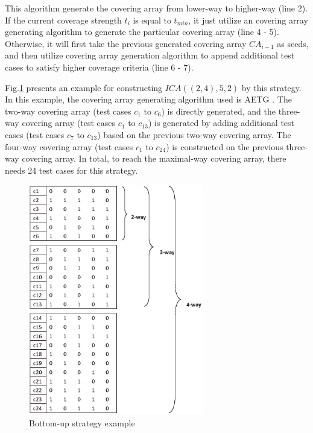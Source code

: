 \documentclass[conference]{IEEEtran}
\theoremstyle{definition}
\begin{document}
This algorithm generate the covering array from lower-way to higher-way (line 2). If the current coverage strength $t_{i}$ is equal to $t_{min}$, it just utilize an covering array generating algorithm to generate the particular covering array (line 4 - 5). Otherwise, it will first take the previous generated covering array $CA_{i - 1}$ as seeds, and then utilize covering array generation algorithm to append additional test cases to satisfy higher coverage criteria (line 6 - 7).
%

Fig.\ref{increase-example} presents an example for constructing $ICA((2,4), 5, 2)$ by this strategy. In this example, the covering array generating algorithm used is AETG \cite{cohen1997aetg}. The two-way covering array (test cases $c_{1}$ to $c_{6}$) is directly generated, and the three-way covering array (test cases $c_{1}$ to $ c_{13}$) is generated by adding additional test cases (test cases $c_{7}$ to $c_{13}$) based on the previous two-way covering array. The four-way covering array (test cases $c_{1}$ to $c_{24}$) is constructed on the previous three-way covering array. In total, to reach the maximal-way covering array, there needs 24 test cases for this strategy.
\begin{figure}
\center
 \includegraphics[width=3.0in]{increase_example.eps}
\caption{Bottom-up strategy example}
\label{increase-example}
\end{figure}
\end{document}
